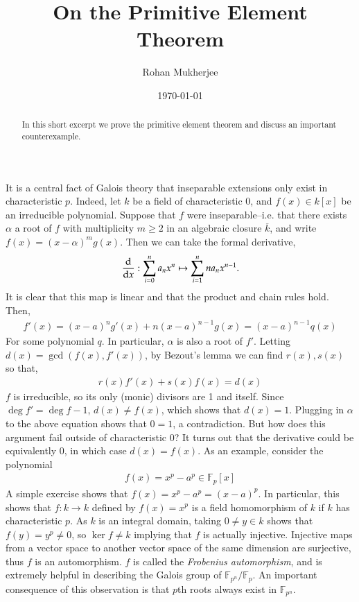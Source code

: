 \documentclass[12pt]{article}
\title{On the Primitive Element Theorem}
\date{\today}
\author{Rohan Mukherjee}
\theoremstyle{definitionstyle}
\def\mbb#1{\mathbb{#1}}
\newcommand{\F}{\mbb F}
\begin{document}
	\maketitle
	\begin{abstract}
		In this short excerpt we prove the primitive element theorem and discuss an important counterexample.
	\end{abstract}

	It is a central fact of Galois theory that inseparable extensions only exist in characteristic $p$. Indeed, let $k$ be a field of characteristic 0, and $f(x) \in k[x]$ be an irreducible polynomial. Suppose that $f$ were inseparable--i.e. that there exists $\alpha$  a root of $f$ with multiplicity $m \geq 2$ in an algebraic closure $\overline k$, and write $f(x) = (x-\alpha)^mg(x)$. Then we can take the formal derivative, 
	\begin{align*}
		\dv{x}: \sum_{i=0}^n a_nx^n \mapsto \sum_{i=1}^{n} na_nx^{n-1}.
	\end{align*}
	It is clear that this map is linear and that the product and chain rules hold. Then,
	\begin{align*}
		f'(x) = (x-a)^ng'(x) + n(x-a)^{n-1}g(x) = (x-a)^{n-1} q(x)
	\end{align*}
	For some polynomial $q$. In particular, $\alpha$ is also a root of $f'$. Letting $d(x) = \gcd(f(x), f'(x))$, by Bezout's lemma we can find $r(x), s(x)$ so that,
	\begin{align*}
		r(x)f'(x) + s(x)f(x) = d(x)
	\end{align*}
	$f$ is irreducible, so its only (monic) divisors are 1 and itself. Since $\deg f' = \deg f - 1$, $d(x) \neq f(x)$, which shows that $d(x) = 1$. Plugging in $\alpha$ to the above equation shows that $0 = 1$, a contradiction. But how does this argument fail outside of characteristic 0? It turns out that the derivative could be equivalently 0, in which case $d(x) = f(x)$. As an example, consider the polynomial
	\begin{align*}
		f(x) = x^p - a^p \in \F_p[x]
	\end{align*}
	A simple exercise shows that $f(x) = x^p - a^p = (x-a)^p$. In particular, this shows that $f: k \to k$ defined by $f(x) = x^p$ is a field homomorphism of $k$ if $k$ has characteristic $p$. As $k$ is an integral domain, taking $0 \neq y \in k$ shows that $f(y) = y^p \neq 0$, so $\ker f \neq k$ implying that $f$ is actually injective. Injective maps from a vector space to another vector space of the same dimension are surjective, thus $f$ is an automorphism. $f$ is called the \textit{Frobenius automorphism}, and is extremely helpful in describing the Galois group of $\F_{p^n} / \F_p$. An important consequence of this observation is that $p$th roots always exist in $\F_{p^n}$. 
	
\end{document}
